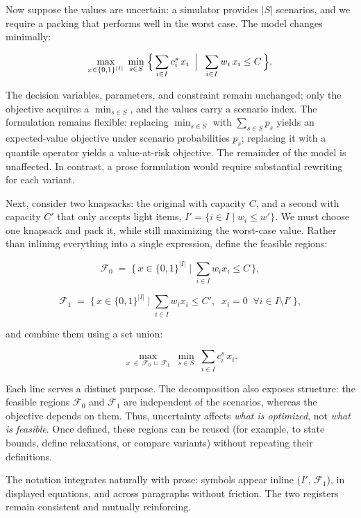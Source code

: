 Now suppose the values are uncertain: a simulator provides \(|S|\)
scenarios, and we require a packing that performs well in the worst
case. The model changes minimally:

\[
\max_{x \in \{0,1\}^{|I|}} \; \min_{s \in S} \;\Bigl\{\, \sum_{i \in I} c^s_i\, x_i \;\;\Big|\;\; \sum_{i \in I} w_i\, x_i \le C \,\Bigr\}.
\]

The decision variables, parameters, and constraint remain unchanged;
only the objective acquires a \(\min_{s \in S}\), and the values carry a
scenario index. The formulation remains flexible: replacing
\(\min_{s \in S}\) with \(\sum_{s \in S} p_s\) yields an expected-value
objective under scenario probabilities \(p_s\); replacing it with a
quantile operator yields a value-at-risk objective. The remainder of the
model is unaffected. In contrast, a prose formulation would require
substantial rewriting for each variant.

Next, consider two knapsacks: the original with capacity \(C\), and a
second with capacity \(C'\) that only accepts light items,
\(I' = \{i \in I \mid w_i \le w'\}\). We must choose one knapsack and
pack it, while still maximizing the worst-case value. Rather than
inlining everything into a single expression, define the feasible
regions:

\[
\mathcal{F}_0 \;=\; \bigl\{\, x \in \{0,1\}^{|I|} \;\big|\; \textstyle\sum_{i \in I} w_i x_i \le C \,\bigr\},
\]

\[
\mathcal{F}_1 \;=\; \bigl\{\, x \in \{0,1\}^{|I|} \;\big|\; \textstyle\sum_{i \in I} w_i x_i \le C',\;\; x_i = 0 \;\;\forall i \in I \setminus I' \,\bigr\},
\]

and combine them using a set union:

\[
\max_{x \;\in\; \mathcal{F}_0 \,\cup\, \mathcal{F}_1} \; \min_{s \in S} \;\sum_{i \in I} c^s_i\, x_i.
\]

Each line serves a distinct purpose. The decomposition also exposes
structure: the feasible regions \(\mathcal{F}_0\) and \(\mathcal{F}_1\)
are independent of the scenarios, whereas the objective depends on them.
Thus, uncertainty affects \emph{what is optimized}, not \emph{what is
feasible}. Once defined, these regions can be reused (for example, to
state bounds, define relaxations, or compare variants) without
repeating their definitions.

The notation integrates naturally with prose: symbols appear inline
(\(I'\), \(\mathcal{F}_1\)), in displayed equations, and across
paragraphs without friction. The two registers remain consistent and
mutually reinforcing.

